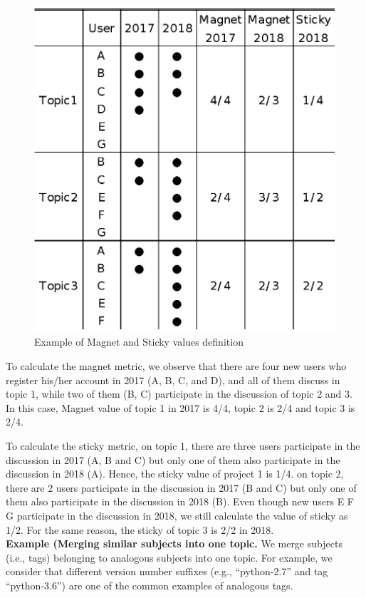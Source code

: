 \documentclass[english,preprint,JIP]{ipsj}
\begin{document}
\begin{figure}[t]
 \centering
 \includegraphics[width=.75\hsize]{img/explainofMS.eps}  
 \caption{Example of Magnet and Sticky values definition} 
 \label{fig:example2} 
\end{figure}


To calculate the magnet metric, we observe that there are four new users who register his/her account in 2017 (A, B, C, and D), and all of them discuss in topic 1, while two of them (B, C) participate in the discussion of topic 2 and 3. In this case, Magnet value of topic 1 in 2017 is 4/4, topic 2 is 2/4 and topic 3 is 2/4.

To calculate the sticky metric, on topic 1, there are three users participate in the discussion in 2017 (A, B and C) but only one of them also participate in the discussion in 2018 (A). Hence, the sticky value of project 1 is 1/4. on topic 2, there are 2 users participate in the discussion in 2017 (B and C) but only one of them also participate in the discussion in 2018 (B). Even though new users E F G participate in the discussion in 2018, we still calculate the value of sticky as 1/2. For the same reason, the sticky of topic 3 is 2/2 in 2018.\\

\noindent
\textbf{Example (Merging similar subjects into one topic.}
We merge subjects (i.e., tags) belonging to analogous subjects into one topic. For example, we consider that different version number suffixes (e.g., ``python-2.7'' and tag ``python-3.6'') are one of the common examples of analogous tags. 
\end{document}

